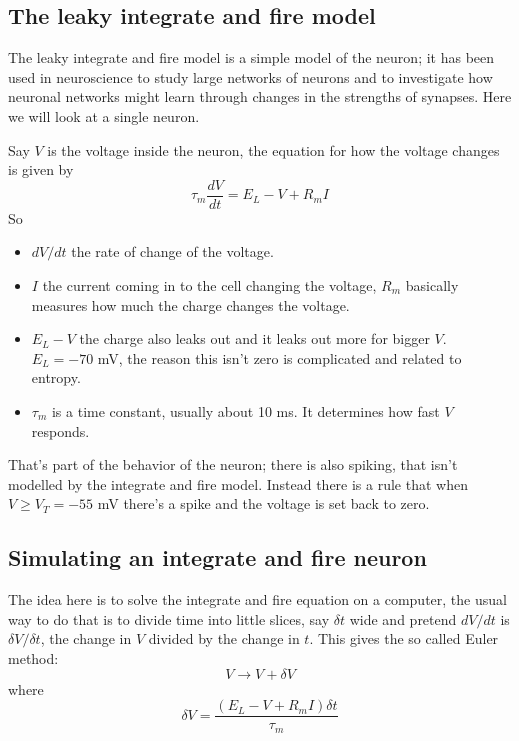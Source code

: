\documentclass[11pt,a4paper]{scrartcl}
\begin{document}
\subsection*{The leaky integrate and fire model}

The leaky integrate and fire model is a simple model of the neuron; it
has been used in neuroscience to study large networks of neurons and
to investigate how neuronal networks might learn through changes in
the strengths of synapses. Here we will look at a single neuron. 

Say $V$ is the voltage inside the neuron, the equation for how the
voltage changes is given by
\begin{equation}
\tau_m\frac{dV}{dt}=E_L-V+R_mI
\end{equation}
So
\begin{itemize}
\item $dV/dt$ the rate of change of the voltage.
\item $I$ the current coming in to the cell changing the voltage,
  $R_m$ basically measures how much the charge changes the voltage.
\item $E_L-V$ the charge also leaks out and it leaks out more for
  bigger $V$. $E_L=-70$ mV, the reason this isn't zero is complicated
  and related to entropy.
\item $\tau_m$ is a time constant, usually about 10 ms. It determines
  how fast $V$ responds.
\end{itemize}

That's part of the behavior of the neuron; there is also spiking, that
isn't modelled by the integrate and fire model. Instead there is a
rule that when $V\ge V_T=-55$ mV there's a spike and the voltage is
set back to zero.

\subsection*{Simulating an integrate and fire neuron}

The idea here is to solve the integrate and fire equation on a
computer, the usual way to do that is to divide time into little
slices, say $\delta t$ wide and pretend $dV/dt$ is $\delta V/\delta t$,
the change in $V$ divided by the change in $t$. This gives the so
called Euler method:
\begin{equation}
V\rightarrow V+\delta V
\end{equation}
where 
\begin{equation}
\delta V= \frac{(E_L-V+R_mI)\delta t}{\tau_m}
\end{equation}
\end{document}
